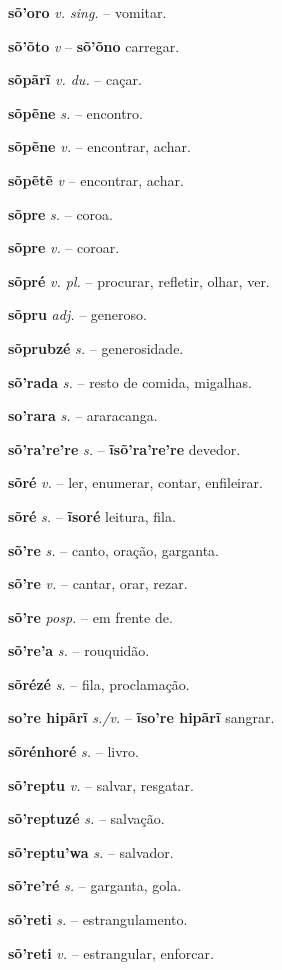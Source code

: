 \textbf{sõ'oro} \textit{v. sing.} -- vomitar.

\textbf{sõ'õto} \textit{v} -- \textbf{sõ'õno} carregar.

\textbf{sõpãrĩ} \textit{v. du.} -- caçar.

\textbf{sõpẽne} \textit{s.} -- encontro.

\textbf{sõpẽne} \textit{v.} -- encontrar, achar.

\textbf{sõpẽtẽ} \textit{v} -- encontrar, achar.

\textbf{sõpre} \textit{s.} -- coroa.

\textbf{sõpre} \textit{v.} -- coroar.

\textbf{sõpré} \textit{v. pl.} -- procurar, refletir, olhar, ver.

\textbf{sõpru} \textit{adj.} -- generoso.

\textbf{sõprubzé} \textit{s.} -- generosidade.

\textbf{sõ'rada} \textit{s.} -- resto de comida, migalhas.

\textbf{so'rara} \textit{s.} -- araracanga.

\textbf{sõ'ra're're} \textit{s.} -- \textbf{ĩsõ'ra're're} devedor.

\textbf{sõré} \textit{v.} -- ler, enumerar, contar, enfileirar.

\textbf{sõré} \textit{s.} -- \textbf{ĩsoré} leitura, fila.

\textbf{sõ're} \textit{s.} -- canto, oração, garganta.

\textbf{sõ're} \textit{v.} -- cantar, orar, rezar.

\textbf{sõ're} \textit{posp.} -- em frente de.

\textbf{sõ're'a} \textit{s.} -- rouquidão.

\textbf{sõrézé} \textit{s.} -- fila, proclamação.

\textbf{so're hipãrĩ} \textit{s./v.} -- \textbf{ĩso're hipãrĩ} sangrar.

\textbf{sõrénhoré} \textit{s.} -- livro.

\textbf{sõ'reptu} \textit{v.} -- salvar, resgatar.

\textbf{sõ'reptuzé} \textit{s.} -- salvação.

\textbf{sõ'reptu'wa} \textit{s.} -- salvador.

\textbf{sõ're'ré} \textit{s.} -- garganta, gola.

\textbf{sõ'reti} \textit{s.} -- estrangulamento.

\textbf{sõ'reti} \textit{v.} -- estrangular, enforcar.


